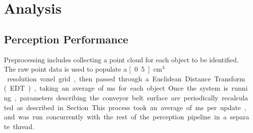 \documentclass[letterpaper, 10 pt, conference]{ieeeconf}  %
\begin{document}
\section{Analysis}
\subsection{Perception Performance}
Preprocessing includes collecting a point cloud for each object to be
identified. The raw point data is used to populate a \unit[0.5]{cm$^3$}
resolution voxel grid, then passed through a Euclidean Distance
Transform (EDT), taking an average of \unit[304]{ms} for each object.

 
Once the system is running, parameters describing the conveyor belt
surface are periodically recalculated as described in
Section. This process took an average of
\unit[39]{ms} per update, and was run concurrently with the rest of
the perception pipeline in a separate thread.

\end{document}
